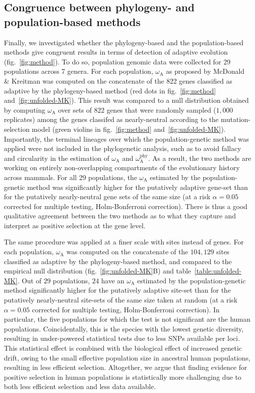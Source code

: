 \documentclass[9pt,twocolumn,twoside,lineno]{pnas-new}
\newcommand{\rateApop}{\omega_{\mathrm{A}}}
\newcommand{\rateAphy}{\rateApop^{\mathrm{phy}}}
\begin{document}
\subsection*{Congruence between phylogeny- and population-based methods}
Finally, we investigated whether the phylogeny-based and the population-based methods give congruent results in terms of detection of adaptive evolution (fig.~\ref{fig:method}).
To do so, population genomic data were collected for 29 populations across 7 genera.
For each population, $\rateApop$ as proposed by McDonald \& Kreitman\cite[MK]{mcdonald_adaptative_1991} was computed on the concatenate of the 822 genes classified as adaptive by the phylogeny-based method (red dots in fig.~\ref{fig:method} and~\ref{fig:unfolded-MK}).
This result was compared to a null distribution obtained by computing $\rateApop$ over sets of 822 genes that were randomly sampled ($1,000$ replicates) among the genes classifed as nearly-neutral according to the mutation-selection model (green violins in fig.~\ref{fig:method} and~\ref{fig:unfolded-MK}).
Importantly, the terminal lineages over which the population-genetic method was applied were not included in the phylogenetic analysis, such as to avoid fallacy and circularity in the estimation of $\rateApop$ and $\rateAphy$.
As a result, the two methods are working on entirely non-overlapping compartments of the evolutionary history across mammals.
For all 29 populations, the $\rateApop$ estimated by the population-genetic method was significantly higher for the putatively adaptive gene-set than for the putatively nearly-neutral gene sets of the same size (at a risk $\alpha=0.05$ corrected for multiple testing, Holm-Bonferroni correction).
There is thus a good qualitative agreement between the two methods as to what they capture and interpret as positive selection at the gene level.

The same procedure was applied at a finer scale with sites instead of genes.
For each population, $\rateApop$ was computed on the concatenate of the $104,129$ sites classified as adaptive by the phylogeny-based method, and compared to the empirical null distribution (fig.~\ref{fig:unfolded-MK}B) and table~\ref{table:unfolded-MK}.
Out of $29$ populations, $24$ have an $\rateApop$ estimated by the population-genetic method significantly higher for the putatively adaptive site-set than for the putatively nearly-neutral site-sets of the same size taken at random (at a risk $\alpha=0.05$ corrected for multiple testing, Holm-Bonferroni correction).
In particular, the five populations for which the test is not significant are the human populations.
Coincidentally, this is the species with the lowest genetic diversity, resulting in under-powered statistical tests due to less SNPs available per loci.
This statistical effect is combined with the biological effect of increased genetic drift, owing to the small effective population size in ancestral human populations, resulting in less efficient selection.
Altogether, we argue that finding evidence for positive selection in human populations is statistically more challenging due to both less efficient selection and less data available.
\end{document}
